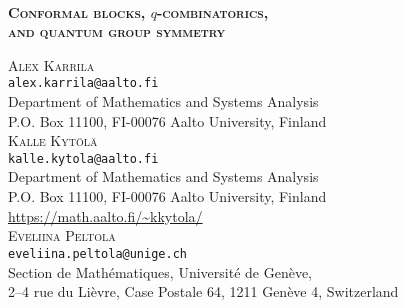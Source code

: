 \documentclass[oneside,english]{amsart}
\numberwithin{equation}{section}
\numberwithin{figure}{section}
\theoremstyle{plain}
\theoremstyle{plain}
\theoremstyle{plain}
\theoremstyle{remark}
\theoremstyle{plain}
\theoremstyle{plain}
\theoremstyle{plain}
\theoremstyle{plain}
\theoremstyle{plain}
\theoremstyle{plain}
\theoremstyle{plain}
\theoremstyle{plain}
\newcommand{\blue}[1]{{\color{blue} #1}}
\begin{document}

\author{A.~Karrila, K.~Kytölä, and E.~Peltola}

\

\vspace{2.5cm}

\begin{center}
\LARGE \bf \scshape {
Conformal blocks, $q$-combinatorics, \\ and quantum group symmetry
}%
\end{center}

\vspace{0.75cm}

\begin{center}
{\large \scshape Alex Karrila}\\
{\footnotesize{\tt alex.karrila@aalto.fi}}\\
{\small{Department of Mathematics and Systems Analysis}}\\
{\small{P.O. Box 11100, FI-00076 Aalto University, Finland}}\bigskip{}
\\
{\large \scshape Kalle Kyt\"ol\"a}\\
{\footnotesize{\tt kalle.kytola@aalto.fi}}\\
{\small{Department of Mathematics and Systems Analysis}}\\
{\small{P.O. Box 11100, FI-00076 Aalto University, Finland}\\
\url{https://math.aalto.fi/~kkytola/}}\bigskip{}
\\
{\large \scshape Eveliina Peltola}\\
{\footnotesize{\tt eveliina.peltola@unige.ch}}\\
{\small{Section de Math\'{e}matiques, Universit\'{e} de Gen\`{e}ve,}}\\
{\small{2--4 rue du Li\`{e}vre, Case Postale 64, 1211 Gen\`{e}ve 4, Switzerland}}
\end{center}

\vspace{0.75cm}

\end{document}
